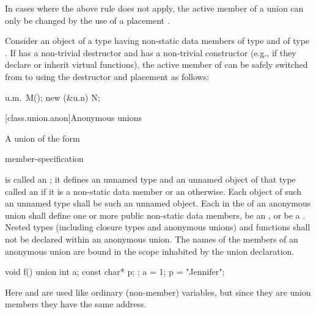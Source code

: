 \pnum
\begin{note}
In cases where the above rule does not apply,
the active member of a union can only be changed by
the use of a placement .
\end{note}
\begin{example}
Consider an object  of a  type  having non-static data members
 of type  and  of type . If  has a non-trivial
destructor and  has a non-trivial constructor (e.g., if they declare or inherit
virtual functions), the active member of  can be safely switched from  to
 using the destructor and placement  as follows:
\begin{codeblock}
u.m.~M();
new (&u.n) N;
\end{codeblock}
\end{example}

[class.union.anon]{Anonymous unions}
%

\pnum
{}%
%
A union of the form
\begin{ncsimplebnf}
 \terminal{\{} member-specification \terminal{\}} \terminal{;}
\end{ncsimplebnf}
is called an ; it defines an unnamed type and
an unnamed object of that type called
an 
if it is a non-static data member or
an  otherwise.
Each object of such an unnamed type shall be such an unnamed object.
%
%
Each  in the 
of an anonymous union shall define one or more public non-static data members,
be an , or
be a .
Nested types
(including closure types and anonymous unions)
and functions
shall not be declared within an anonymous union.
The names of the members of an anonymous union
are bound in the scope inhabited by the union declaration.
\begin{example}
\begin{codeblock}
void f() {
  union { int a; const char* p; };
  a = 1;
  p = "Jennifer";
}
\end{codeblock}

Here  and  are used like ordinary (non-member)
variables, but since they are union members they have the same address.
\end{example}

